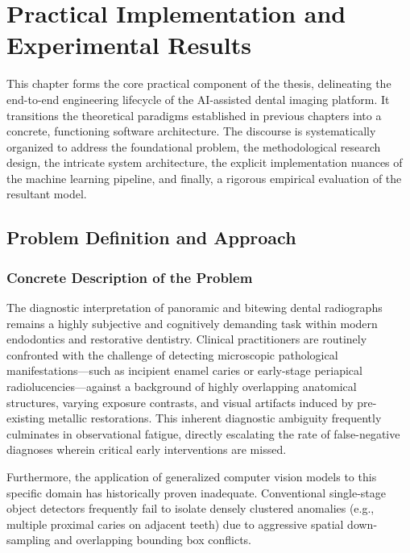 \chapter{Practical Implementation and Experimental Results}
\label{chap:ch3_practical}

\par This chapter forms the core practical component of the thesis, delineating the end-to-end engineering lifecycle of the AI-assisted dental imaging platform. It transitions the theoretical paradigms established in previous chapters into a concrete, functioning software architecture. The discourse is systematically organized to address the foundational problem, the methodological research design, the intricate system architecture, the explicit implementation nuances of the machine learning pipeline, and finally, a rigorous empirical evaluation of the resultant model.

\section{Problem Definition and Approach}
\label{sec:ch4_problem_approach}

\subsection{Concrete Description of the Problem}
\par The diagnostic interpretation of panoramic and bitewing dental radiographs remains a highly subjective and cognitively demanding task within modern endodontics and restorative dentistry. Clinical practitioners are routinely confronted with the challenge of detecting microscopic pathological manifestations—such as incipient enamel caries or early-stage periapical radiolucencies—against a background of highly overlapping anatomical structures, varying exposure contrasts, and visual artifacts induced by pre-existing metallic restorations. This inherent diagnostic ambiguity frequently culminates in observational fatigue, directly escalating the rate of false-negative diagnoses wherein critical early interventions are missed.
\par Furthermore, the application of generalized computer vision models to this specific domain has historically proven inadequate. Conventional single-stage object detectors frequently fail to isolate densely clustered anomalies (e.g., multiple proximal caries on adjacent teeth) due to aggressive spatial down-sampling and overlapping bounding box conflicts. 

